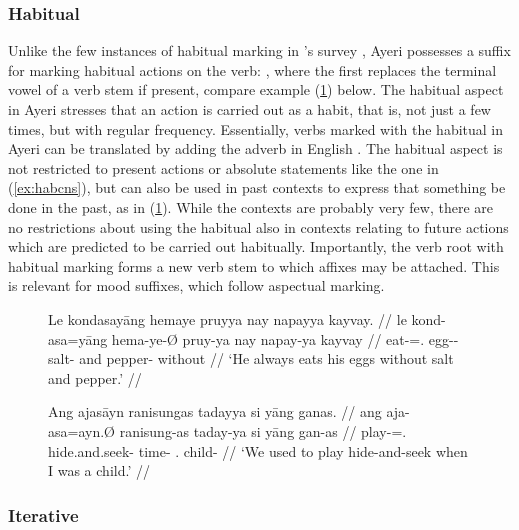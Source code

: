 
\subsubsection{Habitual}

Unlike the few instances of habitual marking in \citet{dahl1985}'s survey
\citep[96]{dahl1985}, Ayeri possesses a suffix for marking habitual actions on
the verb: , where the first  replaces the terminal vowel
of a verb stem if present, compare example (\ref{ex:habvwl}) below. The
habitual aspect in Ayeri stresses that an action is carried out as a habit,
that is, not just a few times, but with regular frequency. Essentially, verbs
marked with the habitual in Ayeri can be translated by adding the adverb
 in English \citep[97]{dahl1985}. The habitual aspect is not
restricted to present actions or absolute statements like the one in
(\ref{ex:habcns}), but can also be used in past contexts to express that
something  be done in the past, as in (\ref{ex:habvwl}). While the
contexts are probably very few, there are no restrictions about using the
habitual also in contexts relating to future actions which are predicted to be
carried out habitually. Importantly, the verb root with habitual marking forms
a new verb stem to which affixes may be attached. This is relevant for mood
suffixes, which follow aspectual marking.

\begin{figure}[h]
\pex
\a\label{ex:habcns}\begingl
	\gla Le kondasayāng hemaye pruyya nay napayya kayvay. //
	\glb le kond-asa=yāng hema-ye-Ø pruy-ya nay napay-ya kayvay //
	\glc \PatTI{} eat-\Hab{}=\TsgM{}.\Aarg{} egg-\Pl{}-\Top{} salt-\Loc{} 
		and pepper-\Loc{} without //
	\glft `He always eats his eggs without salt and pepper.' //
\endgl

\a\label{ex:habvwl}\begingl
	\gla Ang ajasāyn ranisungas tadayya si yāng ganas. //
	\glb ang aja-asa=ayn.Ø ranisung-as taday-ya si yāng gan-as //
	\glc \AgtT{} play-\Hab{}=\Fpl{}.\Top{} hide.and.seek-\Parg{} 
		time-\Loc{} \Rel{} \Fsg{}.\Aarg{} child-\Parg{} //
	\glft `We used to play hide-and-seek when I was a child.' //
\endgl
\xe
\end{figure}


\subsubsection{Iterative}
\label{subsubsec:iterative}

